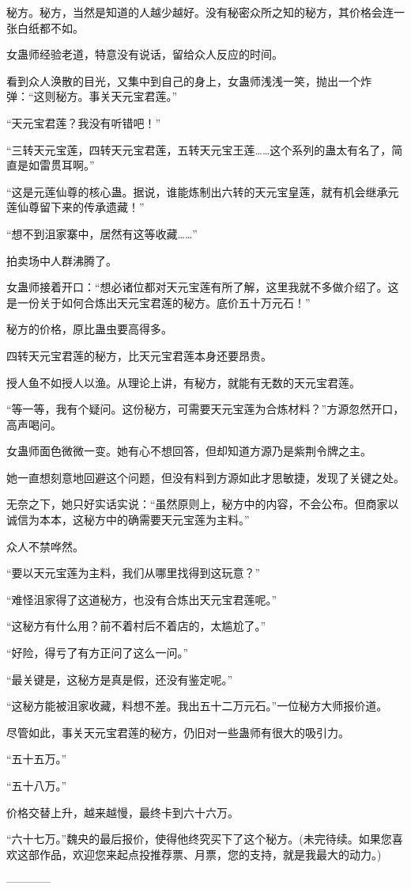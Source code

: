 \begin{this_body}
秘方。秘方，当然是知道的人越少越好。没有秘密众所之知的秘方，其价格会连一张白纸都不如。

女蛊师经验老道，特意没有说话，留给众人反应的时间。

看到众人涣散的目光，又集中到自己的身上，女蛊师浅浅一笑，抛出一个炸弹：“这则秘方。事关天元宝君莲。”

“天元宝君莲？我没有听错吧！”

“三转天元宝莲，四转天元宝君莲，五转天元宝王莲……这个系列的蛊太有名了，简直是如雷贯耳啊。”

“这是元莲仙尊的核心蛊。据说，谁能炼制出六转的天元宝皇莲，就有机会继承元莲仙尊留下来的传承遗藏！”

“想不到沮家寨中，居然有这等收藏……”

拍卖场中人群沸腾了。

女蛊师接着开口：“想必诸位都对天元宝莲有所了解，这里我就不多做介绍了。这是一份关于如何合炼出天元宝君莲的秘方。底价五十万元石！”

秘方的价格，原比蛊虫要高得多。

四转天元宝君莲的秘方，比天元宝君莲本身还要昂贵。

授人鱼不如授人以渔。从理论上讲，有秘方，就能有无数的天元宝君莲。

“等一等，我有个疑问。这份秘方，可需要天元宝莲为合炼材料？”方源忽然开口，高声喝问。

女蛊师面色微微一变。她有心不想回答，但却知道方源乃是紫荆令牌之主。

她一直想刻意地回避这个问题，但没有料到方源如此才思敏捷，发现了关键之处。

无奈之下，她只好实话实说：“虽然原则上，秘方中的内容，不会公布。但商家以诚信为本本，这秘方中的确需要天元宝莲为主料。”

众人不禁哗然。

“要以天元宝莲为主料，我们从哪里找得到这玩意？”

“难怪沮家得了这道秘方，也没有合炼出天元宝君莲呢。”

“这秘方有什么用？前不着村后不着店的，太尴尬了。”

“好险，得亏了有方正问了这么一问。”

“最关键是，这秘方是真是假，还没有鉴定呢。”

“这秘方能被沮家收藏，料想不差。我出五十二万元石。”一位秘方大师报价道。

尽管如此，事关天元宝君莲的秘方，仍旧对一些蛊师有很大的吸引力。

“五十五万。”

“五十八万。”

价格交替上升，越来越慢，最终卡到六十六万。

“六十七万。”魏央的最后报价，使得他终究买下了这个秘方。(未完待续。如果您喜欢这部作品，欢迎您来起点投推荐票、月票，您的支持，就是我最大的动力。)

------------

\end{this_body}

